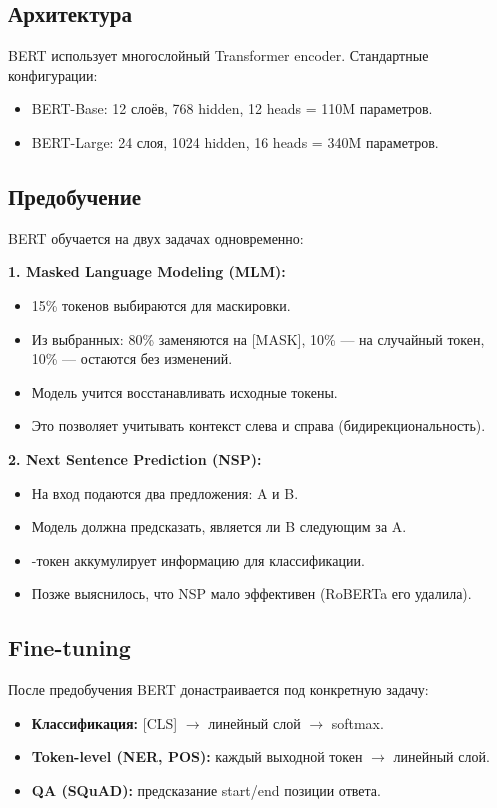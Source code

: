 \documentclass[a4paper,12pt]{article}
\begin{document}
\subsection{Архитектура}
BERT использует многослойный Transformer encoder. Стандартные конфигурации:
\begin{itemize}
    \item BERT-Base: 12 слоёв, 768 hidden, 12 heads = 110M параметров.
    \item BERT-Large: 24 слоя, 1024 hidden, 16 heads = 340M параметров.
\end{itemize}

\subsection{Предобучение}
BERT обучается на двух задачах одновременно:

\textbf{1. Masked Language Modeling (MLM):}
\begin{itemize}
    \item 15\% токенов выбираются для маскировки.
    \item Из выбранных: 80\% заменяются на [MASK], 10\% --- на случайный токен, 10\% --- остаются без изменений.
    \item Модель учится восстанавливать исходные токены.
    \item Это позволяет учитывать контекст слева и справа (бидирекциональность).
\end{itemize}

\textbf{2. Next Sentence Prediction (NSP):}
\begin{itemize}
    \item На вход подаются два предложения: A и B.
    \item Модель должна предсказать, является ли B следующим за A.
    \item [CLS]-токен аккумулирует информацию для классификации.
    \item Позже выяснилось, что NSP мало эффективен (RoBERTa его удалила).
\end{itemize}

\subsection{Fine-tuning}
После предобучения BERT донастраивается под конкретную задачу:

\begin{itemize}
    \item \textbf{Классификация:} [CLS] $\to$ линейный слой $\to$ softmax.
    \item \textbf{Token-level (NER, POS):} каждый выходной токен $\to$ линейный слой.
    \item \textbf{QA (SQuAD):} предсказание start/end позиции ответа.
\end{itemize}
\end{document}
